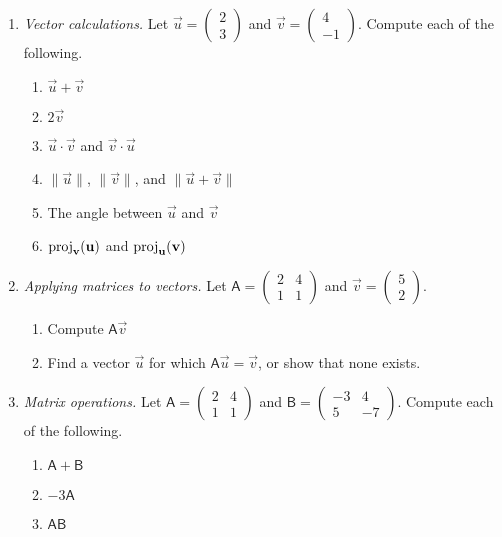 \begin{enumerate}
\item \emph{Vector calculations.} Let $\vec{u} = \begin{pmatrix} 2 \\ 3 \end{pmatrix}$ and $\vec{v} = \begin{pmatrix} 4 \\ -1 \end{pmatrix}$. Compute each of the following.
\begin{enumerate}
\item $\vec{u} + \vec{v}$
\item $2\vec{v}$
\item $\vec{u}\cdot\vec{v}$ and $\vec{v}\cdot\vec{u}$
\item $\|\vec{u}\|$, $\|\vec{v}\|$, and $\|\vec{u} + \vec{v}\|$
\item The angle between $\vec{u}$ and $\vec{v}$
\item $\operatorname{proj}_{\mathbf{v}}(\mathbf{u})$ and $\operatorname{proj}_{\mathbf{u}}(\mathbf{v})$
\end{enumerate}
\item \emph{Applying matrices to vectors.} Let $\mathsf{A} = \begin{pmatrix} 2 & 4 \\ 1 & 1 \end{pmatrix}$ and $\vec{v} = \begin{pmatrix} 5 \\ 2 \end{pmatrix}$.
\begin{enumerate}
\item Compute $\mathsf{A}\vec{v}$
\item Find a vector $\vec{u}$ for which $\mathsf{A}\vec{u} = \vec{v}$, or show that none exists.
\end{enumerate}
\item \emph{Matrix operations.} Let $\mathsf{A} = \begin{pmatrix} 2 & 4 \\ 1 & 1 \end{pmatrix}$ and $\mathsf{B} = \begin{pmatrix} -3 & 4 \\ 5 & -7 \end{pmatrix}$. Compute each of the following.
\begin{enumerate}
\item $\mathsf{A} + \mathsf{B}$
\item $-3\mathsf{A}$
\item $\mathsf{AB}$

\end{enumerate}
\end{enumerate}
